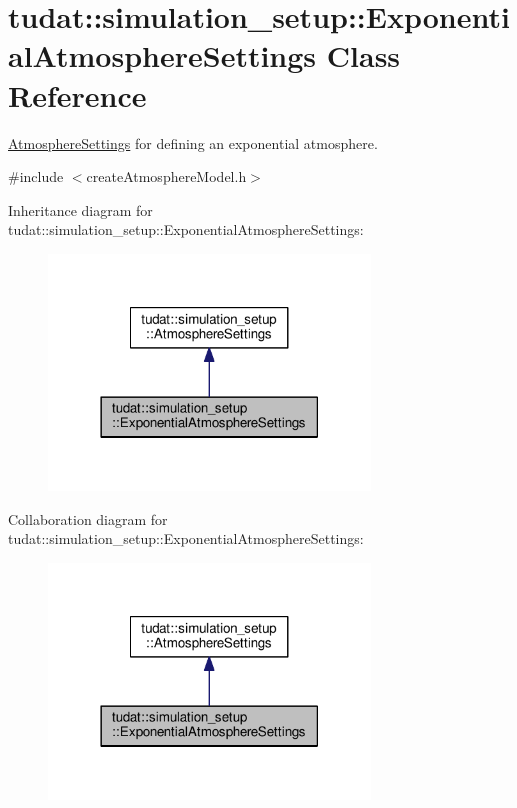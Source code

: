 \hypertarget{classtudat_1_1simulation__setup_1_1ExponentialAtmosphereSettings}{}\section{tudat\+:\+:simulation\+\_\+setup\+:\+:Exponential\+Atmosphere\+Settings Class Reference}
\label{classtudat_1_1simulation__setup_1_1ExponentialAtmosphereSettings}


\hyperlink{classtudat_1_1simulation__setup_1_1AtmosphereSettings}{Atmosphere\+Settings} for defining an exponential atmosphere.  




{\ttfamily \#include $<$create\+Atmosphere\+Model.\+h$>$}



Inheritance diagram for tudat\+:\+:simulation\+\_\+setup\+:\+:Exponential\+Atmosphere\+Settings\+:
\nopagebreak
\begin{figure}[H]
\begin{center}
\leavevmode
\includegraphics[width=242pt]{classtudat_1_1simulation__setup_1_1ExponentialAtmosphereSettings__inherit__graph}
\end{center}
\end{figure}


Collaboration diagram for tudat\+:\+:simulation\+\_\+setup\+:\+:Exponential\+Atmosphere\+Settings\+:
\nopagebreak
\begin{figure}[H]
\begin{center}
\leavevmode
\includegraphics[width=242pt]{classtudat_1_1simulation__setup_1_1ExponentialAtmosphereSettings__coll__graph}
\end{center}
\end{figure}
